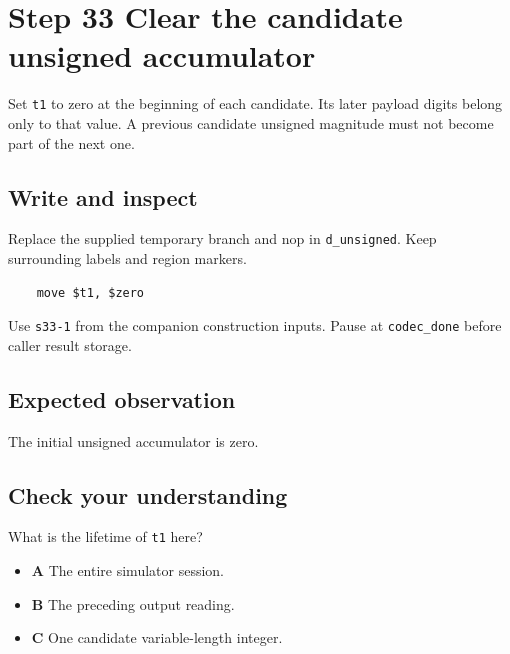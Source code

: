 \section{Step 33 Clear the candidate unsigned accumulator}\label{delta-s33}

Set \texttt{t1} to zero at the beginning of each candidate. Its later payload digits belong only to that value. A previous candidate unsigned magnitude must not become part of the next one.

\subsection{Write and inspect}
Replace the supplied temporary branch and nop in \texttt{d\_unsigned}. Keep surrounding labels and region markers.

\begin{verbatim}
    move $t1, $zero
\end{verbatim}
Use \texttt{s33-1} from the companion construction inputs. Pause at \texttt{codec\_done} before caller result storage.

\subsection{Expected observation}
The initial unsigned accumulator is zero.

\subsection{Check your understanding}
What is the lifetime of \texttt{t1} here?

\begin{itemize}
  \item \textbf{A} The entire simulator session.
  \item \textbf{B} The preceding output reading.
  \item \textbf{C} One candidate variable-length integer.
\end{itemize}
